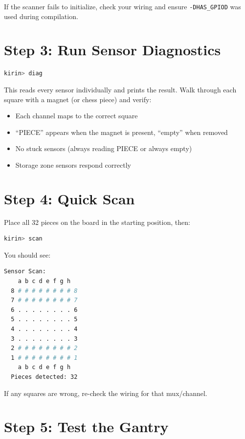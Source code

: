 \documentclass[11pt,a4paper]{report}
\begin{document}
If the scanner fails to initialize, check your wiring and ensure \texttt{-DHAS\_GPIOD} was used during compilation.

\section{Step 3: Run Sensor Diagnostics}

\begin{lstlisting}[language=bash, numbers=none]
kirin> diag
\end{lstlisting}

This reads every sensor individually and prints the result. Walk through each square with a magnet (or chess piece) and verify:

\begin{itemize}
    \item Each channel maps to the correct square
    \item ``PIECE'' appears when the magnet is present, ``empty'' when removed
    \item No stuck sensors (always reading PIECE or always empty)
    \item Storage zone sensors respond correctly
\end{itemize}

\section{Step 4: Quick Scan}

Place all 32 pieces on the board in the starting position, then:

\begin{lstlisting}[language=bash, numbers=none]
kirin> scan
\end{lstlisting}

You should see:

\begin{lstlisting}[language=bash, numbers=none]
  Sensor Scan:
    a b c d e f g h
  8 # # # # # # # # 8
  7 # # # # # # # # 7
  6 . . . . . . . . 6
  5 . . . . . . . . 5
  4 . . . . . . . . 4
  3 . . . . . . . . 3
  2 # # # # # # # # 2
  1 # # # # # # # # 1
    a b c d e f g h
  Pieces detected: 32
\end{lstlisting}

If any squares are wrong, re-check the wiring for that mux/channel.

\section{Step 5: Test the Gantry}
\end{document}
